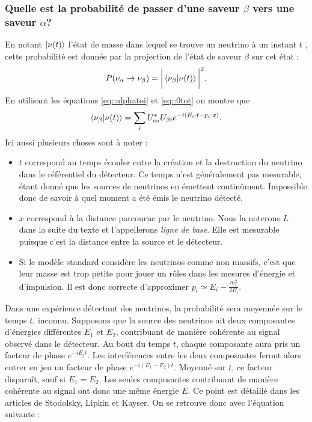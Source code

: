             \subsubsection{Quelle est la probabilité de passer d'une saveur $\beta$ vers une saveur $\alpha$?}
            En notant $\ket{\nu(t)}$ l'état de masse dans lequel se trouve un neutrino à un instant $t$ , cette probabilité est donnée par la projection de l'état de saveur $\beta$ sur cet état :
            \begin{equation}
                P(\nu_{\alpha}\to\nu_{\beta})=\bigg|\braket{\nu_{\beta}}{\nu(t)}\bigg|^2.
            \end{equation}
            En utilisant les équations \eqref{eq::alphatoi} et \eqref{eq::0tot} on montre que
            \begin{equation}
                \braket{\nu_{\beta}}{\nu(t)} = \sum_i U_{\alpha i}^*U_{\beta i} e^{-i(E_i\cdot t - p_i\cdot x)}.
            \end{equation}
            Ici aussi plusieurs choses sont à noter : 
            \begin{itemize}
                \item $t$ correspond au temps écouler entre la création et la destruction du neutrino dans le référentiel du détecteur. Ce temps n'est généralement pas mesurable, étant donné que les sources de neutrinos en émettent continûment. Impossible donc de savoir à quel moment a été émis le neutrino détecté.
                \item $x$ correspond à la distance parcourue par le neutrino. Nous la noterons $L$ dans la suite du texte et l'appellerons \textit{ligne de base}. Elle est mesurable puisque c'est la distance entre la source et le détecteur.
                \item Si le modèle standard considère les neutrinos comme non massifs, c'est que leur masse est trop petite pour jouer un rôles dans les mesures d'énergie et d'impulsion. Il est donc correcte d'approximer $p_i \simeq E_i - \frac{m_i^2}{2E_i}$.
            \end{itemize}
            Dans une expérience détectant des neutrinos, la probabilité sera moyennée sur le temps $t$, inconnu. Supposons que la source des neutrinos ait deux composantes d'énergies différentes $E_1$ et $E_2$, contribuant de manière cohérente au signal observé dans le détecteur. Au bout du temps $t$, chaque composante aura pris un facteur de phase $e^{-iE_jt}$. Les interférences entre les deux composantes feront alors entrer en jeu un facteur de phase $e^{-i(E_1-E_2)t}$. Moyenné sur $t$, ce facteur disparaît, sauf si $E_1 = E_2$. Les seules composantes contribuant de manière cohérente au signal ont donc une même énergie $E$. Ce point est détaillé dans les articles de Stodolsky\cite{Stodolsky1998}, Lipkin\cite{Lipkin2005} et Kayser\cite{Kayser2005}. On se retrouve donc avec l'équation suivante : 
